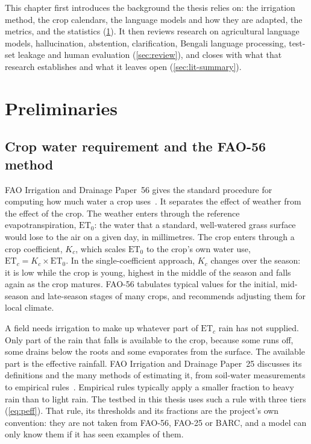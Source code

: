 This chapter first introduces the background the thesis relies on: the irrigation method, the crop calendars, the language models and how they are adapted, the metrics, and the statistics (\cref{sec:preliminaries}). It then reviews research on agricultural language models, hallucination, abstention, clarification, Bengali language processing, test-set leakage and human evaluation (\cref{sec:review}), and closes with what that research establishes and what it leaves open (\cref{sec:lit-summary}).

\section{Preliminaries}
\label{sec:preliminaries}

\subsection{Crop water requirement and the FAO-56 method}
\label{sec:prelim-fao}

FAO Irrigation and Drainage Paper~56 gives the standard procedure for computing how much water a crop uses~\cite{allen1998fao56}. It separates the effect of weather from the effect of the crop. The weather enters through the reference evapotranspiration, $\mathrm{ET}_0$: the water that a standard, well-watered grass surface would lose to the air on a given day, in millimetres. The crop enters through a crop coefficient, $K_c$, which scales $\mathrm{ET}_0$ to the crop's own water use, $\mathrm{ET}_c = K_c \times \mathrm{ET}_0$. In the single-coefficient approach, $K_c$ changes over the season: it is low while the crop is young, highest in the middle of the season and falls again as the crop matures. FAO-56 tabulates typical values for the initial, mid-season and late-season stages of many crops, and recommends adjusting them for local climate.

A field needs irrigation to make up whatever part of $\mathrm{ET}_c$ rain has not supplied. Only part of the rain that falls is available to the crop, because some runs off, some drains below the roots and some evaporates from the surface. The available part is the effective rainfall. FAO Irrigation and Drainage Paper~25 discusses its definitions and the many methods of estimating it, from soil-water measurements to empirical rules~\cite{dastane1978effective}. Empirical rules typically apply a smaller fraction to heavy rain than to light rain. The testbed in this thesis uses such a rule with three tiers (\cref{eq:peff}). That rule, its thresholds and its fractions are the project's own convention: they are not taken from FAO-56, FAO-25 or BARC, and a model can only know them if it has seen examples of them.

